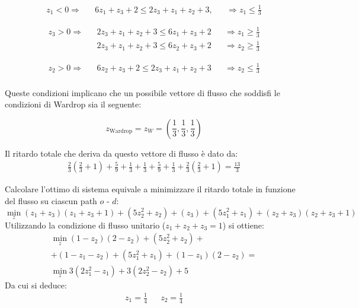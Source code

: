 \documentclass[11pt,largemargins]{homework}
\begin{document}
\begin{alphaparts}
  \begin{align*}
      z_1<0 \Rightarrow  && 6z_1 + z_3 + 2 \leq 2z_3+z_1+z_2+3,  && \Rightarrow z_1 \leq \frac{1}{3}
    \end{align*}

  \begin{align*}
    z_3>0 \Rightarrow && 2z_3+z_1+z_2+3 \leq 6z_1 + z_3 + 2 && \Rightarrow z_1 \geq \frac{1}{3}\\
    && 2z_3+z_1+z_2+3 \leq 6z_2 + z_3 + 2 && \Rightarrow z_2 \geq \frac{1}{3}
  \end{align*}

  \begin{align*}
    z_2>0 \Rightarrow && 6z_2 + z_3 + 2 \leq 2z_3+z_1+z_2+3 && \Rightarrow z_2 \leq \frac{1}{3}\\
  \end{align*}
  
  Queste condizioni implicano che un possibile vettore di flusso che soddisfi le condizioni di Wardrop sia il seguente:

  \begin{equation*}
    z_{\text{Wardrop}} = z_W = \left(\frac{1}{3},\frac{1}{3},\frac{1}{3}\right)
  \end{equation*}

  Il ritardo totale che deriva da questo vettore di flusso è dato da:
  \begin{align*}
    \frac{2}{3}\left(\frac{2}{3}+1 \right) + \frac{5}{9} + \frac{1}{3} + \frac{1}{3} + \frac{5}{9} + \frac{1}{3} + \frac{2}{3}\left(\frac{2}{3}+1 \right) = \frac{13}{3}
  \end{align*}
  \questionpart

  Calcolare l'ottimo di sistema equivale a minimizzare il ritardo totale in funzione del flusso su ciascun path \(o\) - \(d\):
  \begin{equation*}
    \min\limits_z (z_1+z_3)(z_1+z_3+1)+(5z_2^2+z_2)+(z_3)+(5z_1^2+z_1)+(z_2+z_3)(z_2+z_3+1)
  \end{equation*}
  Utilizzando la condizione di flusso unitario (\(z_1+z_2+z_3=1\)) si ottiene:
  \begin{eqnarray*}
    \min\limits_z (1-z_2)(2-z_2)+(5z_2^2+z_2)+\\
    +(1-z_1-z_2)+(5z_1^2+z_1)+(1-z_1)(2-z_2)=\\
    \min\limits_z 3(2z_1^2-z_1)+3(2z_2^2-z_2)+5
  \end{eqnarray*}
  Da cui si deduce:
  \begin{align*}
    z_1=\frac{1}{4} && z_2 = \frac{1}{4}
  \end{align*}


\end{alphaparts}
\end{document}
